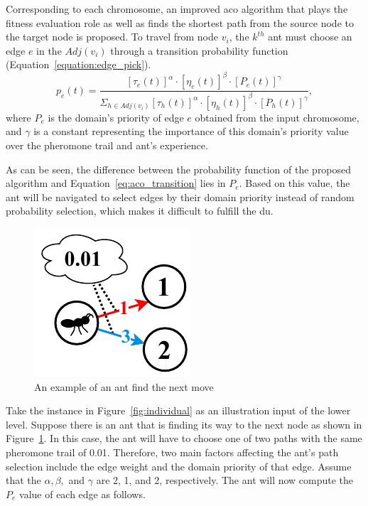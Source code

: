 Corresponding to each chromosome, an improved \gls{aco} algorithm that plays the fitness evaluation role as well as finds the shortest path from the source node to the target node is proposed. 
To travel from node $v_i$, the $k^{th}$ ant must choose an edge $e$ in the $Adj(v_i)$ through a transition probability function (Equation~\ref{equation:edge_pick}).
\begin{equation}
	\label{equation:edge_pick}
	p_e(t) = 
	\frac{[\tau_e(t)]^{\alpha} \cdot [\eta_e(t)]^{\beta} \cdot  [P_e(t)]^{\gamma}}{\Sigma_{h \in Adj(v_i)} [\tau_h(t)]^{\alpha} \cdot [\eta_h(t)]^{\beta} \cdot [P_h(t)]^{\gamma}},
\end{equation}
where $P_e$ is the domain's priority of edge $e$ obtained from the input chromosome, and $\gamma$ is a constant representing the importance of this domain's priority value over the pheromone trail and ant's experience.

As can be seen, the difference between the probability function of the proposed algorithm and Equation~\ref{eq:aco_transition} lies in $P_e$. Based on this value, the ant will be navigated to select edges by their domain priority instead of random probability selection, which makes it difficult to fulfill the \gls{du}.
\bigskip
\setlength{\intextsep}{3pt}
\renewcommand{\scalefigure}{1.1}
\begin{figure}[htbp]
	\centering
	\includegraphics[scale=\scalefigure]{Figures/chap 3/pACO.pdf}
	\caption{An example of an ant find the next move}
	\label{fig:pACO}
\end{figure}

Take the instance in Figure~\ref{fig:individual} as an illustration input of the lower level. Suppose there is an ant that is finding its way to the next node as shown in Figure~\ref{fig:pACO}. In this case, the ant will have to choose one of two paths with the same pheromone trail of 0.01. Therefore, two main factors affecting the ant's path selection include the edge weight and the domain priority of that edge. Assume that the $\alpha, \beta,$ and $\gamma$ are 2, 1, and 2, respectively. The ant will now compute the $P_e$ value of each edge as follows.

